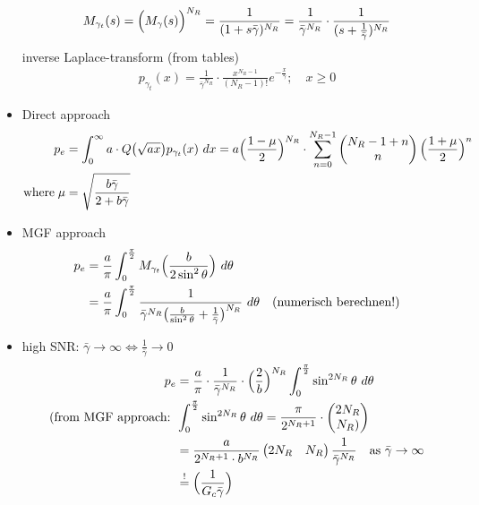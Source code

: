 \documentclass[a4paper, 10pt]{article}
\begin{document}
\begin{itemize}
			\begin{align*}
				M_{\gamma _t}(s) = \Bigl (M_\gamma (s)\Bigr )^{N_R} = \frac{1}{(1 + s\bar{\gamma})^{N_R}} = \frac{1}{\bar{\gamma}^{N_R}}\cdot \frac{1}{(s + \frac{1}{\bar{\gamma}})^{N_R}}
			\end{align*}
			inverse Laplace-transform (from tables)
			\begin{align*}
				p_{\gamma _t}(x) = \frac{1}{\bar{\gamma}^{N_R}}\cdot \frac{x^{N_R-1}}{(N_R - 1)!}e^{-\frac{x}{\bar{\gamma}}};\quad x\geq 0
			\end{align*}
	\item Direct approach 
		\begin{align*}
			p_e &= \int_{0}^{\infty}a\cdot Q\bigl (\sqrt{ax} \bigr )p_{\gamma _t}(x)~dx = a\Bigl (\frac{1 - \mu}{2}\Bigr )^{N_R} \cdot \sum_{n = 0}^{N_R - 1}\begin{pmatrix} N_R - 1 + n \\ n\end{pmatrix}\Bigl (\frac{1 + \mu}{2}\Bigr )^n \\ \text{where}\; \mu &= \sqrt{\frac{b\bar{\gamma}}{2 + b\bar{\gamma}}}
		\end{align*}
		\item MGF approach
			\begin{align*}
				p_e &= \frac{a}{\pi}\int_{0}^{\frac{\pi}{2}}M_{\gamma _t}\Bigl ( \frac{b}{2\sin ^2\theta}\Bigr )~d\theta \\
				&= \frac{a}{\pi}\int_{0}^{\frac{\pi}{2}}\frac{1}{\bar{\gamma}^{N_R}\bigl (\frac{b}{\sin ^2\theta} + \frac{1}{\bar{\gamma}}\bigr )^{N_R}}~d\theta \quad \text{(numerisch berechnen!)}
			\end{align*}
			\item high SNR: \quad \begin{math}\bar{\gamma}\rightarrow \infty \Longleftrightarrow \frac{1}{\bar{\gamma}}\rightarrow 0 \end{math}
	\begin{align*}
				p_e &= \frac{a}{\pi}\cdot\frac{1}{\bar{\gamma}^{N_R}}\cdot \Bigl (\frac{2}{b}\Bigr )^{N_R}\int_{0}^{\frac{\pi}{2}}\sin ^{2N_R}\theta ~d\theta \\
				 (\text{from MGF approach: }  &\int_{0}^{\frac{\pi}{2}}\sin ^{2N_R}\theta ~d\theta = \frac{\pi}{2^{N_R + 1}}\cdot \begin{pmatrix} 2N_R \\ N_R) \end{pmatrix}\\ &= \frac{a}{2^{N_R+1}\cdot b^{N_R}}\begin{pmatrix}2N_R & N_R\end{pmatrix}\frac{1}{\bar{\gamma}^{N_R}}\quad \text{as } \bar{\gamma} \rightarrow \infty \\ &\stackrel{!}{=} \Bigl (\frac{1}{G_c\bar{\gamma}}\Bigr )\\

\end{align*}
\end{itemize}
\end{document}
